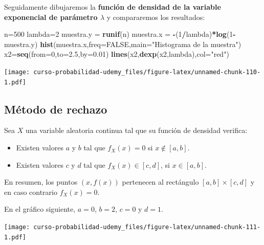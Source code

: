 \documentclass[]{book}
\newenvironment{Shaded}{\begin{snugshade}}{\end{snugshade}}
\newcommand{\DataTypeTok}[1]{\textcolor[rgb]{0.13,0.29,0.53}{#1}}
\newcommand{\DecValTok}[1]{\textcolor[rgb]{0.00,0.00,0.81}{#1}}
\newcommand{\FloatTok}[1]{\textcolor[rgb]{0.00,0.00,0.81}{#1}}
\newcommand{\KeywordTok}[1]{\textcolor[rgb]{0.13,0.29,0.53}{\textbf{#1}}}
\newcommand{\NormalTok}[1]{#1}
\newcommand{\OperatorTok}[1]{\textcolor[rgb]{0.81,0.36,0.00}{\textbf{#1}}}
\newcommand{\OtherTok}[1]{\textcolor[rgb]{0.56,0.35,0.01}{#1}}
\newcommand{\StringTok}[1]{\textcolor[rgb]{0.31,0.60,0.02}{#1}}
\providecommand{\tightlist}{%
  \setlength{\itemsep}{0pt}\setlength{\parskip}{0pt}}
\begin{document}
Seguidamente dibujaremos la \textbf{función de densidad de la variable exponencial de parámetro \(\lambda\)} y compararemos los resultados:

\begin{Shaded}
\begin{Highlighting}[]
\NormalTok{n=}\DecValTok{500}
\NormalTok{lambda=}\DecValTok{2}
\NormalTok{muestra.y =}\StringTok{ }\KeywordTok{runif}\NormalTok{(n)}
\NormalTok{muestra.x =}\StringTok{ }\OperatorTok{-}\NormalTok{(}\DecValTok{1}\OperatorTok{/}\NormalTok{lambda)}\OperatorTok{*}\KeywordTok{log}\NormalTok{(}\DecValTok{1}\OperatorTok{-}\NormalTok{muestra.y)}
\KeywordTok{hist}\NormalTok{(muestra.x,}\DataTypeTok{freq=}\OtherTok{FALSE}\NormalTok{,}\DataTypeTok{main=}\StringTok{"Histograma de la muestra"}\NormalTok{)}
\NormalTok{x2=}\KeywordTok{seq}\NormalTok{(}\DataTypeTok{from=}\DecValTok{0}\NormalTok{,}\DataTypeTok{to=}\FloatTok{2.5}\NormalTok{,}\DataTypeTok{by=}\FloatTok{0.01}\NormalTok{)}
\KeywordTok{lines}\NormalTok{(x2,}\KeywordTok{dexp}\NormalTok{(x2,lambda),}\DataTypeTok{col=}\StringTok{"red"}\NormalTok{)}
\end{Highlighting}
\end{Shaded}

\texttt{[image: curso-probabilidad-udemy\_files/figure-latex/unnamed-chunk-110-1.pdf]}

\hypertarget{muxe9todo-de-rechazo}{%
\subsection{Método de rechazo}\label{muxe9todo-de-rechazo}}

Sea \(X\) una variable aleatoria continua tal que su función de densidad verifica:

\begin{itemize}
\tightlist
\item
  Existen valores \(a\) y \(b\) tal que \(f_X(x)= 0\) si \(x\not\in [a,b]\).
\item
  Existen valores \(c\) y \(d\) tal que \(f_X(x)\in [c,d]\), si \(x\in [a,b]\).
\end{itemize}

En resumen, los puntos \((x,f(x))\) pertenecen al rectángulo \([a,b]\times [c,d]\) y en caso contrario \(f_X(x)=0\).

En el gráfico siguiente, \(a=0\), \(b=2\), \(c=0\) y \(d=1\).

\texttt{[image: curso-probabilidad-udemy\_files/figure-latex/unnamed-chunk-111-1.pdf]}
\end{document}
